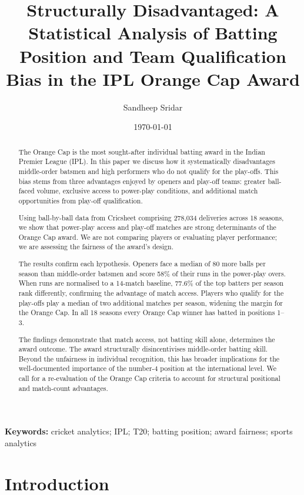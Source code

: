 \documentclass[11pt]{article}
\title{\textbf{Structurally Disadvantaged: A Statistical Analysis of
Batting Position and Team Qualification Bias in the IPL Orange Cap Award}}
\author[1]{Sandheep Sridar}
\affil[1]{\small Independent Researcher \\ \texttt{sandeepsridar@gmail.com}}
\date{\today}
\begin{document}
\maketitle

\begin{abstract}
\noindent
The Orange Cap is the most sought-after individual batting award in the Indian
Premier League (IPL). In this paper we discuss how it systematically
disadvantages middle-order batsmen and high performers who do not qualify for
the play-offs. This bias stems from three advantages enjoyed by openers and
play-off teams: greater ball-faced volume, exclusive access to power-play
conditions, and additional match opportunities from play-off qualification.

Using ball-by-ball data from Cricsheet comprising 278{,}034 deliveries across
18 seasons, we show that power-play access and play-off matches are strong
determinants of the Orange Cap award. We are not comparing players or evaluating
player performance; we are assessing the fairness of the award's design.

The results confirm each hypothesis. Openers face a median of 80 more balls per
season than middle-order batsmen and score 58\% of their runs in the power-play
overs. When runs are normalised to a 14-match baseline, 77.6\% of the top batters
per season rank differently, confirming the advantage of match access. Players who
qualify for the play-offs play a median of two additional matches per season,
widening the margin for the Orange Cap. In all 18 seasons every Orange Cap winner
has batted in positions 1--3.

The findings demonstrate that match access, not batting skill alone, determines
the award outcome. The award structurally disincentivises middle-order batting
skill. Beyond the unfairness in individual recognition, this has broader
implications for the well-documented importance of the number-4 position at the
international level. We call for a re-evaluation of the Orange Cap criteria to
account for structural positional and match-count advantages.
\end{abstract}

\vspace{0.5em}
\noindent\textbf{Keywords:} cricket analytics; IPL; T20; batting position;
award fairness; sports analytics

\section{Introduction}
\end{document}
